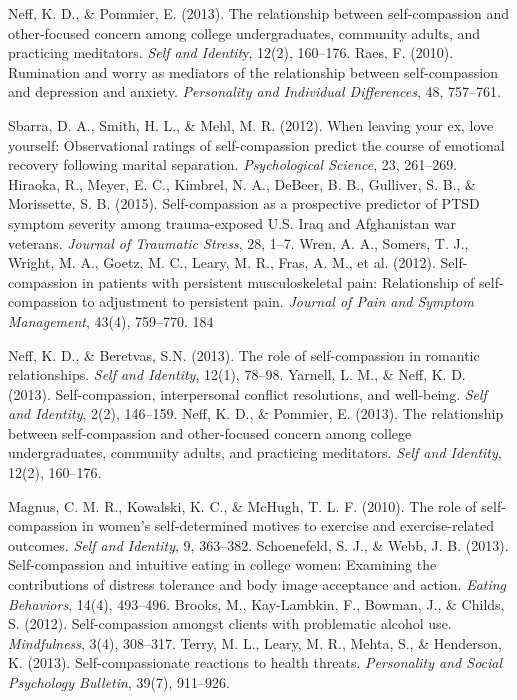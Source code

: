 \begin{thebibliography}{999}
	 Neff, K. D., \& Pommier, E. (2013). The relationship between self-compassion and other-focused concern among college undergraduates, community adults, and practicing meditators. \textit{Self and Identit}y, 12(2), 160–176.
	Raes, F. (2010). Rumination and worry as mediators of the relationship between self-compassion and depression and anxiety. \textit{Personality and Individual Differences}, 48, 757–761.
		
	 Sbarra, D. A., Smith, H. L., \& Mehl, M. R. (2012). When leaving your ex, love yourself: Observational ratings of self-compassion predict the course of emotional recovery following marital separation. \textit{Psychological Science}, 23, 261–269.
	 Hiraoka, R., Meyer, E. C., Kimbrel, N. A., DeBeer, B. B., Gulliver, S. B., \& Morissette, S. B. (2015). Self-compassion as a prospective predictor of PTSD symptom severity among trauma-exposed U.S. Iraq and Afghanistan war veterans. \textit{Journal of Traumatic Stress}, 28, 1–7.
	 Wren, A. A., Somers, T. J., Wright, M. A., Goetz, M. C., Leary, M. R., Fras, A. M., et al. (2012). Self-compassion in patients with persistent musculoskeletal pain: Relationship of self-compassion to adjustment to persistent pain. \textit{Journal of Pain and Symptom Management}, 43(4), 759–770. 184 
	
	 Neff, K. D., \& Beretvas, S.N. (2013). The role of self-compassion in romantic relationships. \textit{Self and Identity}, 12(1), 78–98.
	 Yarnell, L. M., \& Neff, K. D. (2013). Self-compassion, interpersonal conflict resolutions, and well-being. \textit{Self and Identity}, 2(2), 146–159.
	 Neff, K. D., \& Pommier, E. (2013). The relationship between self-compassion and other-focused concern among college undergraduates, community adults, and practicing meditators. \textit{Self and Identity}, 12(2), 160–176.
	
	 Magnus, C. M. R., Kowalski, K. C., \& McHugh, T. L. F. (2010). The role of self-compassion in women’s self-determined motives to exercise and exercise-related outcomes. \textit{Self and Identity}, 9, 363–382.
	 Schoenefeld, S. J., \& Webb, J. B. (2013). Self-compassion and intuitive eating in college women: Examining the contributions of distress tolerance and body image acceptance and action. \textit{Eating Behaviors}, 14(4), 493–496.
	 Brooks, M., Kay-Lambkin, F., Bowman, J., \& Childs, S. (2012). Self-compassion amongst clients with problematic alcohol use. \textit{Mindfulness}, 3(4), 308–317.
	 Terry, M. L., Leary, M. R., Mehta, S., \& Henderson, K. (2013). Self-compassionate reactions to health threats. \textit{Personality and Social Psychology Bulletin}, 39(7), 911–926.
	

\end{thebibliography}
